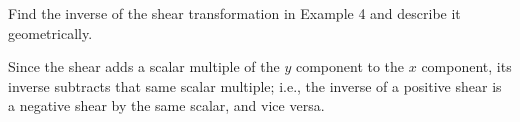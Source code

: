 \documentclass[../main.tex]{subfiles}
\begin{document}
Find the inverse of the shear transformation in Example 4 and describe it geometrically.

\solution
Since the shear adds a scalar multiple of the $y$ component to the $x$ component, its inverse subtracts that same scalar multiple; i.e., the inverse of a positive shear is a negative shear by the same scalar, and vice versa.
\end{document}
